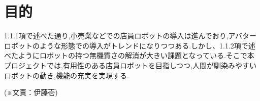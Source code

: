 \section{目的}
\begin{comment}
プロジェクトの目的を記述する.ここでの目的とは,最も高位のものであり,意思や希望を表す.
プロジェクトのテーマの説明にもなるように記述する.
\end{comment}
%
%
1.1.1項で述べた通り,小売業などでの店員ロボットの導入は進んでおり,アバターロボットのような形態での導入がトレンドになりつつある.しかし、1.1.2項で述べたようにロボットの持つ無機質さの解消が大きい課題となっている.そこで本プロジェクトでは,有用性のある店員ロボットを目指しつつ,人間が馴染みやすいロボットの動き,機能の充実を実現する.
\begin{flushright}
(※文責：伊藤壱)
\end{flushright}